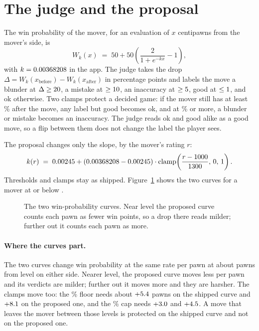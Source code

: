 \documentclass[11pt]{article}
\begin{document}
\section{The judge and the proposal}

The win probability of the mover, for an evaluation of $x$ centipawns from the mover's side,
is
\[
  W_k(x) \;=\; 50 + 50\left(\frac{2}{1+e^{-kx}} - 1\right),
\]
with $k = 0.00368208$ in the app. The judge takes the drop
$\Delta = W_k(x_\text{before}) - W_k(x_\text{after})$ in percentage points and labels the
move a blunder at $\Delta \ge 20$, a mistake at $\ge 10$, an inaccuracy at
$\ge 5$, good at $\le 1$, and ok otherwise. Two clamps protect a decided
game: if the mover still has at least \ThKeptWon\% after the move, any label but good becomes
ok, and at \ThKeptWinning\% or more, a blunder or mistake becomes an inaccuracy. The judge
reads ok and good alike as a good move, so a flip between them does not change the label
the player sees.

The proposal changes only the slope, by the mover's rating $r$:
\[
  k(r) \;=\; 0.00245 + (0.00368208 - 0.00245)\cdot
  \operatorname{clamp}\!\left(\frac{r - 1000}{1300},\, 0,\, 1\right).
\]
Thresholds and clamps stay as shipped. Figure~\ref{fig:curves} shows the two curves for a
mover at or below \RatingFloor.

\begin{figure}[!htbp]
\centering
{}
\caption{The two win-probability curves. Near level the proposed curve counts each pawn as
fewer win points, so a drop there reads milder; further out it counts each pawn as more.}
\label{fig:curves}
\end{figure}

\paragraph{Where the curves part.} The two curves change win probability at the same rate
per pawn at about \CrossoverPawns{} pawns from level on either side. Nearer level, the
proposed curve moves less per pawn and its verdicts are milder; further out it moves more
and they are harsher. The clamps move too: the \ThKeptWon\% floor needs about
$+5.4$ pawns on the shipped curve and $+8.1$ on the proposed one, and the
\ThKeptWinning\% cap needs $+3.0$ and $+4.5$. A move that leaves the mover between
those levels is protected on the shipped curve and not on the proposed one.
\end{document}
